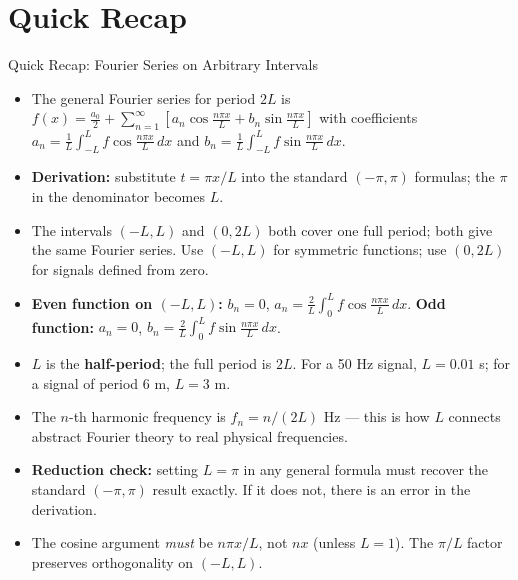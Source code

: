 \documentclass[12pt,a4paper]{article}
\begin{document}
\section{Quick Recap}

\begin{learnbox}{Quick Recap: Fourier Series on Arbitrary Intervals}
\begin{itemize}[leftmargin=*]
  \item The general Fourier series for period $2L$ is
    $f(x) = \frac{a_0}{2} + \sum_{n=1}^{\infty}\!\left[a_n\cos\frac{n\pi x}{L} + b_n\sin\frac{n\pi x}{L}\right]$
    with coefficients $a_n = \frac{1}{L}\int_{-L}^{L}f\cos\frac{n\pi x}{L}\,dx$ and
    $b_n = \frac{1}{L}\int_{-L}^{L}f\sin\frac{n\pi x}{L}\,dx$.
  \item \textbf{Derivation:} substitute $t = \pi x/L$ into the standard $(-\pi,\pi)$ formulas; the $\pi$ in the denominator becomes $L$.
  \item The intervals $(-L,L)$ and $(0,2L)$ both cover one full period; both give the same Fourier series.
    Use $(-L,L)$ for symmetric functions; use $(0,2L)$ for signals defined from zero.
  \item \textbf{Even function on $(-L,L)$:} $b_n = 0$, $a_n = \frac{2}{L}\int_0^L f\cos\frac{n\pi x}{L}\,dx$.
    \textbf{Odd function:} $a_n = 0$, $b_n = \frac{2}{L}\int_0^L f\sin\frac{n\pi x}{L}\,dx$.
  \item $L$ is the \textbf{half-period}; the full period is $2L$.
    For a 50 Hz signal, $L = 0.01$ s; for a signal of period 6 m, $L = 3$ m.
  \item The $n$-th harmonic frequency is $f_n = n/(2L)$ Hz --- this is how $L$ connects abstract Fourier theory to real physical frequencies.
  \item \textbf{Reduction check:} setting $L = \pi$ in any general formula must recover the standard $(-\pi,\pi)$ result exactly. If it does not, there is an error in the derivation.
  \item The cosine argument \emph{must} be $n\pi x/L$, not $nx$ (unless $L = 1$). The $\pi/L$ factor preserves orthogonality on $(-L,L)$.
\end{itemize}
\end{learnbox}
\end{document}

